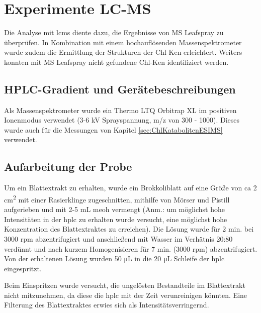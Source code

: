 \chapter{Experimente LC-MS} 

Die Analyse mit \gls{lcms} diente dazu, die Ergebnisse von MS Leafspray zu überprüfen. In Kombination mit einem hochauflösenden Massenspektrometer wurde zudem die Ermittlung der Strukturen der \gls{Chl-K}en erleichtert. Weiters konnten mit MS Leafspray nicht gefundene \gls{Chl-K}en identifiziert werden. \\

\section{HPLC-Gradient und Gerätebeschreibungen} \label{sec:HPLCAufarbeitungderProbe} 

Als Massenspektrometer wurde ein Thermo LTQ Orbitrap XL im positiven Ionenmodus verwendet (3-6 kV Sprayspannung, m/z von 300 - 1000). Dieses wurde auch für die Messungen von Kapitel \ref{sec:ChlKatabolitenESIMS} verwendet.

\section{Aufarbeitung der Probe} \label{sec:HPLCAufarbeitungderProbe}

Um ein Blattextrakt zu erhalten, wurde ein Brokkoliblatt auf eine Größe von \gls{ca} 2 \si{cm^{2}} mit einer Rasierklinge zugeschnitten, mithilfe von Mörser und Pistill aufgerieben und mit 2-5 mL \gls{meoh} vermengt (Anm.: um möglichst hohe Intensitäten in der \gls{hplc} zu erhalten wurde versucht, eine möglichst hohe Konzentration des Blattextraktes zu erreichen). Die Lösung wurde für 2 min. bei 3000 rpm abzentrifugiert und anschließend mit Wasser im Verhätnis 20:80 verdünnt und nach kurzem Homogenisieren für 7 min. (3000 rpm) abzentrifugiert. Von der erhaltenen Lösung wurden 50 \si{\uL} in die 20 \si{\uL} Schleife der \gls{hplc} eingespritzt. 


Beim Einspritzen wurde versucht, die ungelösten Bestandteile im Blattextrakt nicht mitzunehmen, da diese die \gls{hplc} mit der Zeit verunreinigen könnten. Eine Filterung des Blattextraktes erwies sich als Intensitätsverringernd.

